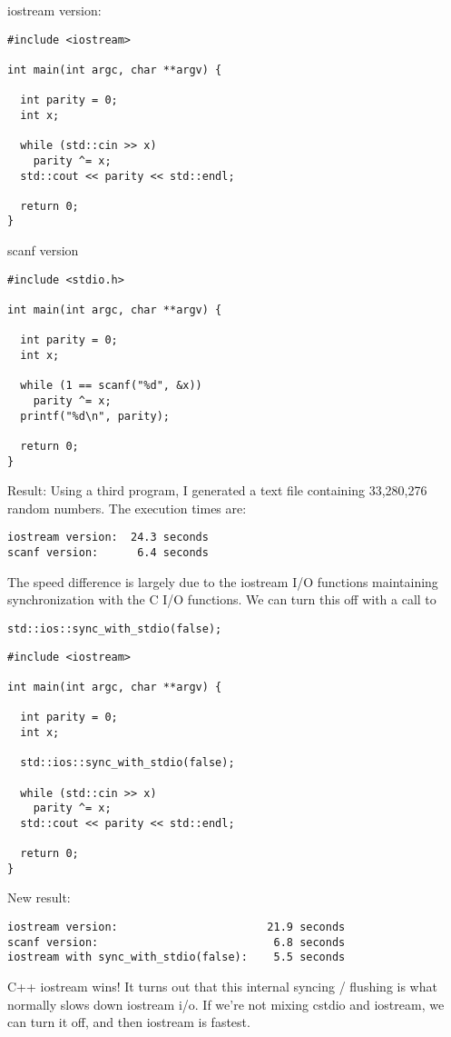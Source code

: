 \documentclass[11pt, a4paper]{article} %
\begin{document}
iostream version:
\begin{lstlisting}
#include <iostream>

int main(int argc, char **argv) {

  int parity = 0;
  int x;

  while (std::cin >> x)
    parity ^= x;
  std::cout << parity << std::endl;

  return 0;
}
\end{lstlisting}
scanf version
\begin{lstlisting}
#include <stdio.h>

int main(int argc, char **argv) {

  int parity = 0;
  int x;

  while (1 == scanf("%d", &x))
    parity ^= x;
  printf("%d\n", parity);

  return 0;
}
\end{lstlisting}
Result:
Using a third program, I generated a text file containing 33,280,276 random numbers. The execution times are:
\begin{lstlisting}
iostream version:  24.3 seconds
scanf version:      6.4 seconds
\end{lstlisting}
The speed difference is largely due to the iostream I/O functions maintaining synchronization with the C I/O functions. We can turn this off with a call to 
\begin{lstlisting}
std::ios::sync_with_stdio(false);
\end{lstlisting}

\begin{lstlisting}
#include <iostream>

int main(int argc, char **argv) {

  int parity = 0;
  int x;

  std::ios::sync_with_stdio(false);

  while (std::cin >> x)
    parity ^= x;
  std::cout << parity << std::endl;

  return 0;
}
\end{lstlisting}
New result:
\begin{lstlisting}
iostream version:                       21.9 seconds
scanf version:                           6.8 seconds
iostream with sync_with_stdio(false):    5.5 seconds
\end{lstlisting}
C++ iostream wins! It turns out that this internal syncing / flushing is what normally slows down iostream i/o. If we're not mixing cstdio and iostream, we can turn it off, and then iostream is fastest.
\end{document}

